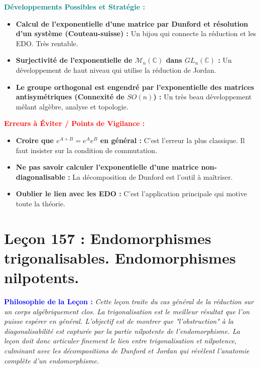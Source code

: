 \documentclass[12pt, a4paper, parskip=full]{report}
\theoremstyle{agregstyle}
\newenvironment{philosophie}
  {\par\medskip\noindent\begin{oframed}\noindent\textbf{\textcolor{blue}{Philosophie de la Leçon :}}\itshape}
  {\end{oframed}\par\medskip}
\newenvironment{developpements}
  {\par\medskip\noindent\begin{oframed}\noindent\textbf{\textcolor{teal}{Développements Possibles et Stratégie :}}}
  {\end{oframed}\par\medskip}
\newenvironment{erreurs}
  {\par\medskip\noindent\begin{oframed}\noindent\textbf{\textcolor{red}{Erreurs à Éviter / Points de Vigilance :}}}
  {\end{oframed}\par\medskip}
\begin{document}
\begin{developpements}
    \begin{itemize}
        \item \textbf{Calcul de l'exponentielle d'une matrice par Dunford et résolution d'un système (Couteau-suisse) :} Un bijou qui connecte la réduction et les EDO. Très rentable.
        \item \textbf{Surjectivité de l'exponentielle de $\mathcal{M}_n(\mathbb{C})$ dans $GL_n(\mathbb{C})$ :} Un développement de haut niveau qui utilise la réduction de Jordan.
        \item \textbf{Le groupe orthogonal est engendré par l'exponentielle des matrices antisymétriques (Connexité de $SO(n)$) :} Un très beau développement mêlant algèbre, analyse et topologie.
    \end{itemize}
\end{developpements}

\begin{erreurs}
    \begin{itemize}
        \item \textbf{Croire que $e^{A+B}=e^A e^B$ en général :} C'est l'erreur la plus classique. Il faut insister sur la condition de commutation.
        \item \textbf{Ne pas savoir calculer l'exponentielle d'une matrice non-diagonalisable :} La décomposition de Dunford est l'outil à maîtriser.
        \item \textbf{Oublier le lien avec les EDO :} C'est l'application principale qui motive toute la théorie.
    \end{itemize}
\end{erreurs}

\newpage
\chapter{Leçon 157 : Endomorphismes trigonalisables. Endomorphismes nilpotents.}

\begin{philosophie}
    Cette leçon traite du cas général de la réduction sur un corps algébriquement clos. La trigonalisation est le meilleur résultat que l'on puisse espérer en général. L'objectif est de montrer que "l'obstruction" à la diagonalisabilité est capturée par la partie nilpotente de l'endomorphisme. La leçon doit donc articuler finement le lien entre trigonalisation et nilpotence, culminant avec les décompositions de Dunford et Jordan qui révèlent l'anatomie complète d'un endomorphisme.
\end{philosophie}
\end{document}
